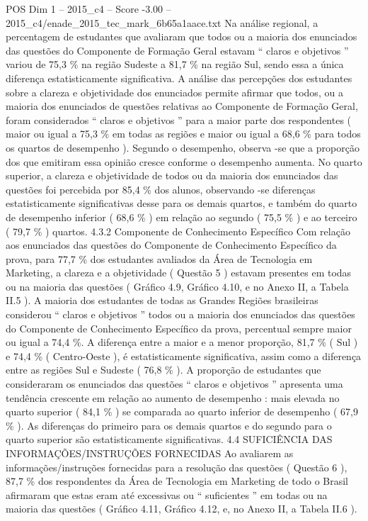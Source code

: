 \begin{textsample}{POS Dim 1 – 2015\_c4 – Score -3.00 – 2015\_c4/enade\_2015\_tec\_mark\_6b65a1aace.txt}
Na análise regional, a percentagem de estudantes que avaliaram que todos ou a maioria dos enunciados das questões do Componente de Formação Geral estavam “ claros e objetivos ” variou de 75,3 \% na região Sudeste a 81,7 \% na região Sul, sendo essa a única diferença estatisticamente significativa.
A análise das percepções dos estudantes sobre a clareza e objetividade dos enunciados permite afirmar que todos, ou a maioria dos enunciados de questões relativas ao Componente de Formação Geral, foram considerados “ claros e objetivos ” para a maior parte dos respondentes ( maior ou igual a 75,3 \% em todas as regiões e maior ou igual a 68,6 \% para todos os quartos de desempenho ).
Segundo o desempenho, observa -se que a proporção dos que emitiram essa opinião cresce conforme o desempenho aumenta.
No quarto superior, a clareza e objetividade de todos ou da maioria dos enunciados das questões foi percebida por 85,4 \% dos alunos, observando -se diferenças estatisticamente significativas desse para os demais quartos, e também do quarto de desempenho inferior ( 68,6 \% ) em relação ao segundo ( 75,5 \% ) e ao terceiro ( 79,7 \% ) quartos. 4.3.2 Componente de Conhecimento Específico Com relação aos enunciados das questões do Componente de Conhecimento Específico da prova, para 77,7 \% dos estudantes avaliados da Área de Tecnologia em Marketing, a clareza e a objetividade ( Questão 5 ) estavam presentes em todas ou na maioria das questões ( Gráfico 4.9, Gráfico 4.10, e no Anexo II, a Tabela II.5 ).
A maioria dos estudantes de todas as Grandes Regiões brasileiras considerou “ claros e objetivos ” todos ou a maioria dos enunciados das questões do Componente de Conhecimento Específico da prova, percentual sempre maior ou igual a 74,4 \%.
A diferença entre a maior e a menor proporção, 81,7 \% ( Sul ) e 74,4 \% ( Centro-Oeste ), é estatisticamente significativa, assim como a diferença entre as regiões Sul e Sudeste ( 76,8 \% ).
A proporção de estudantes que consideraram os enunciados das questões “ claros e objetivos ” apresenta uma tendência crescente em relação ao aumento de desempenho : mais elevada no quarto superior ( 84,1 \% ) se comparada ao quarto inferior de desempenho ( 67,9 \% ).
As diferenças do primeiro para os demais quartos e do segundo para o quarto superior são estatisticamente significativas. 4.4 SUFICIÊNCIA DAS INFORMAÇÕES/INSTRUÇÕES FORNECIDAS Ao avaliarem as informações/instruções fornecidas para a resolução das questões ( Questão 6 ), 87,7 \% dos respondentes da Área de Tecnologia em Marketing de todo o Brasil afirmaram que estas eram até excessivas ou “ suficientes ” em todas ou na maioria das questões ( Gráfico 4.11, Gráfico 4.12, e, no Anexo II, a Tabela II.6 ).

\end{textsample}

